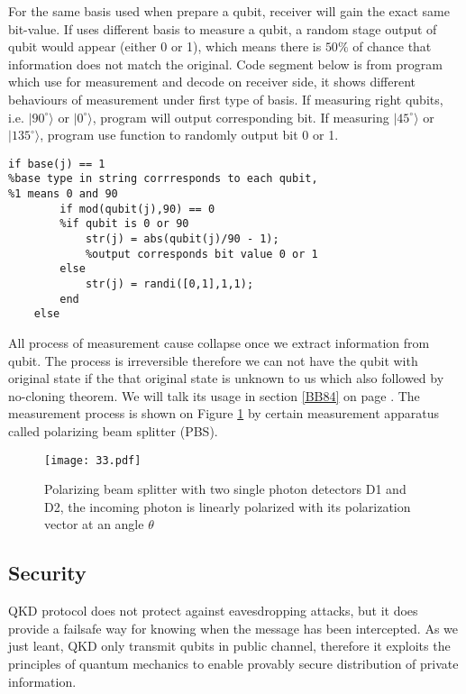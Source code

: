 \documentclass[12pt]{article}
\begin{document}
For the same basis used when prepare a qubit, receiver will gain the exact same bit-value. If uses different basis to measure a qubit, a random stage output of qubit would appear (either 0 or 1), which means there is $50\%$ of chance that information does not match the original. Code segment below is from program  which use for measurement and decode on receiver side, it shows different behaviours of measurement under first type of basis. If measuring right qubits, i.e. $|90^\circ\rangle$ or $|0^\circ\rangle$, program will output corresponding bit. If measuring $|45^\circ\rangle$ or $|135^\circ\rangle$, program use function  to randomly output bit 0 or 1. 
\begin{lstlisting}
if base(j) == 1
%base type in string corrresponds to each qubit, 
%1 means 0 and 90
        if mod(qubit(j),90) == 0
        %if qubit is 0 or 90
            str(j) = abs(qubit(j)/90 - 1);
            %output corresponds bit value 0 or 1
        else
            str(j) = randi([0,1],1,1);
        end
    else
\end{lstlisting}

All process of measurement cause collapse once we extract information from qubit. The process is irreversible therefore we can not have the qubit with original state if the that original state is unknown to us which also followed by no-cloning theorem. We will talk its usage in section \ref{BB84} on page \pageref{measurepage}. The measurement process is shown on Figure \ref{f1} \cite[p.247]{fox2006quantum} by certain measurement apparatus called polarizing beam splitter (PBS).
\begin{figure}[H]
\begin{center}
\texttt{[image: 33.pdf]}
\end{center}
\caption{Polarizing beam splitter with two single photon %
detectors D1 and D2, the incoming photon is linearly %
polarized with its polarization vector at an angle %
$\theta$}\label{f1}

\end{figure}

\subsection{Security}
QKD protocol does not protect against eavesdropping attacks, but it does provide a failsafe way for knowing when the message has been intercepted. \cite[p.246]{fox2006quantum} As we just leant, QKD only transmit qubits in public channel, therefore it exploits the principles of quantum mechanics to enable provably secure distribution of private information. 
\end{document}
